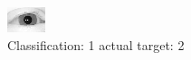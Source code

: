\begin{figure}[h!]
\begin{center}
\includegraphics[width=0.60\columnwidth]{figures/ID3069_class_1_target_2.png}
\end{center}
\caption{ Classification: 1 actual target: 2}
\label{fig:ID3069_class_1_target_2}
\end{figure}

